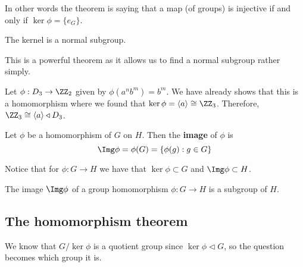 \documentclass[12pt, a4paper]{article}
\begin{document}
\begin{mdnote}
    In other words the theorem is saying that a map (of groups) is injective if and only if \(\ker\phi =\{e_G\}\).
\end{mdnote}

\begin{mdthm}
    The kernel is a normal subgroup.
\end{mdthm}

\begin{mdnote}
    This is a powerful theorem as it allows us to find a normal subgroup rather simply.
\end{mdnote}

\begin{example}
    Let \(\phi : D_3 \to \ZZ_2\) given by \(\phi(a^n b^m) = b^m\). We have already shows that this is a homomorphism where we found that \(\ker \phi = \langle a\rangle \cong \ZZ_3\). Therefore, \(\ZZ_3 \cong \langle a \rangle \triangleleft D_3\).
\end{example}

\begin{definition}
    Let \(\phi\) be a homomorphism of \(G\) on \(H\). Then the \textbf{image} of \(\phi\) is
    \[\Img \phi = \phi(G) = \{\phi(g) : g\in G\}\]
\end{definition}

\begin{mdremark}
    Notice that for \(\phi : G\to H\) we have that \(\ker \phi \subset G\) and \(\Img \phi \subset H\).
\end{mdremark}

\begin{mdthm}
    The image \(\Img \phi \) of a group homomorphism \(\phi :G\to H\) is a subgroup of \(H\).
\end{mdthm}

\subsection{The homomorphism theorem}

We know that \(G / \ker \phi\) is a quotient group since \(\ker \phi \triangleleft G\), so the question becomes which group it is.
\end{document}
